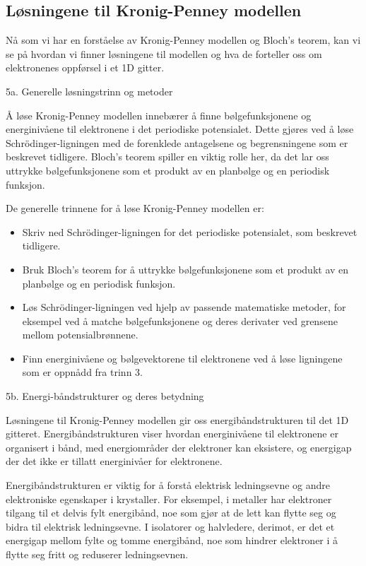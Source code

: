 \subsection*{Løsningene til Kronig-Penney modellen}
Nå som vi har en forståelse av Kronig-Penney modellen og Bloch's teorem, kan vi se på hvordan vi finner løsningene til modellen og hva de forteller oss om elektronenes oppførsel i et 1D gitter.

5a. Generelle løsningstrinn og metoder

Å løse Kronig-Penney modellen innebærer å finne bølgefunksjonene og energinivåene til elektronene i det periodiske potensialet. Dette gjøres ved å løse Schrödinger-ligningen med de forenklede antagelsene og begrensningene som er beskrevet tidligere. Bloch's teorem spiller en viktig rolle her, da det lar oss uttrykke bølgefunksjonene som et produkt av en planbølge og en periodisk funksjon.

De generelle trinnene for å løse Kronig-Penney modellen er:
\begin{itemize}
    \item Skriv ned Schrödinger-ligningen for det periodiske potensialet, som beskrevet tidligere.
    \item Bruk Bloch's teorem for å uttrykke bølgefunksjonene som et produkt av en planbølge og en periodisk funksjon.
    \item Løs Schrödinger-ligningen ved hjelp av passende matematiske metoder, for eksempel ved å matche bølgefunksjonene og deres derivater ved grensene mellom potensialbrønnene.
    \item Finn energinivåene og bølgevektorene til elektronene ved å løse ligningene som er oppnådd fra trinn 3.
\end{itemize}

5b. Energi-båndstrukturer og deres betydning

Løsningene til Kronig-Penney modellen gir oss energibåndstrukturen til det 1D gitteret. Energibåndstrukturen viser hvordan energinivåene til elektronene er organisert i bånd, med energiområder der elektroner kan eksistere, og energigap der det ikke er tillatt energinivåer for elektronene.

Energibåndstrukturen er viktig for å forstå elektrisk ledningsevne og andre elektroniske egenskaper i krystaller. For eksempel, i metaller har elektroner tilgang til et delvis fylt energibånd, noe som gjør at de lett kan flytte seg og bidra til elektrisk ledningsevne. I isolatorer og halvledere, derimot, er det et energigap mellom fylte og tomme energibånd, noe som hindrer elektroner i å flytte seg fritt og reduserer ledningsevnen.

